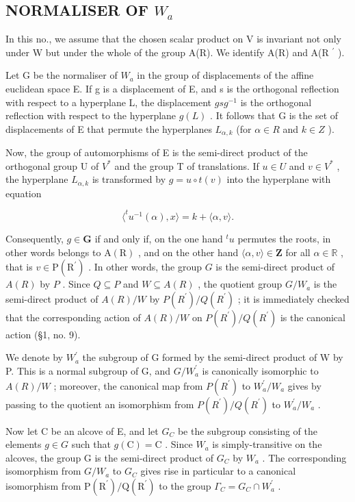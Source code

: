 \subsection{\texorpdfstring{NORMALISER OF \(W_{a}\)}{NORMALISER OF W\_a}}

In this no., we assume that the chosen scalar product on V is invariant not only under W but under the whole of the group A(R). We identify A(R) and A(R \(^{\prime}\) ).

Let G be the normaliser of \(W_{a}\) in the group of displacements of the affine euclidean space E. If g is a displacement of E, and s is the orthogonal reflection with respect to a hyperplane L, the displacement \(gsg^{-1}\) is the orthogonal reflection with respect to the hyperplane \(g(L)\) . It follows that G is the set of displacements of E that permute the hyperplanes \(L_{\alpha,k}\) (for \(\alpha \in R\) and \(k \in Z\) ).

Now, the group of automorphisms of E is the semi-direct product of the orthogonal group U of \(V^{*}\) and the group T of translations. If \(u \in U\) and \(v \in V^{*}\) , the hyperplane \(L_{\alpha,k}\) is transformed by \(g = u \circ t(v)\) into the hyperplane with equation

\[
\langle^ {t} u ^ {- 1} (\alpha), x \rangle = k + \langle \alpha , v \rangle .
\]

Consequently, \(g \in \mathbf{G}\) if and only if, on the one hand \({}^t u\) permutes the roots, in other words belongs to \(\mathrm{A(R)}\) , and on the other hand \(\langle \alpha, v \rangle \in \mathbf{Z}\) for all \(\alpha \in \mathbb{R}\) , that is \(v \in \mathrm{P(R^{\prime})}\) . In other words, the group \(G\) is the semi-direct product of \(A(R)\) by \(P\) . Since \(Q \subseteq P\) and \(W \subseteq A(R)\) , the quotient group \(G / W_a\) is the semi-direct product of \(A(R)/W\) by \(P(R^{\prime})/Q(R^{\prime})\) ; it is immediately checked that the corresponding action of \(A(R)/W\) on \(P(R^{\prime})/Q(R^{\prime})\) is the canonical action (§1, no. 9).

We denote by \(W_{a}^{\prime}\) the subgroup of G formed by the semi-direct product of W by P. This is a normal subgroup of G, and \(G/W_{a}^{\prime}\) is canonically isomorphic to \(A(R)/W\) ; moreover, the canonical map from \(P(R^{\prime})\) to \(W_{a}^{\prime}/W_{a}\) gives by passing to the quotient an isomorphism from \(P(R^{\prime})/Q(R^{\prime})\) to \(W_{a}^{\prime}/W_{a}\) .

Now let C be an alcove of E, and let \(G_{C}\) be the subgroup consisting of the elements \(g \in G\) such that \(g(\mathrm{C}) = \mathrm{C}\) . Since \(W_{a}\) is simply-transitive on the alcoves, the group G is the semi-direct product of \(G_{C}\) by \(W_{a}\) . The corresponding isomorphism from \(G/W_{a}\) to \(G_{C}\) gives rise in particular to a canonical isomorphism from \(\mathrm{P}(\mathrm{R}^{\prime})/\mathrm{Q}(\mathrm{R}^{\prime})\) to the group \(\Gamma_{C} = G_{C} \cap W_{a}^{\prime}\) .

